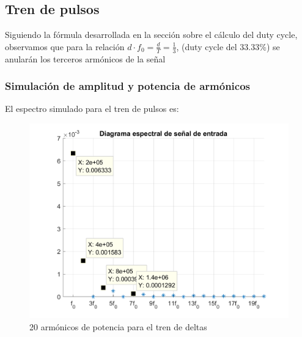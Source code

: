 \documentclass[../../labo_tp5_main.tex]{subfiles}
\begin{document}
\subsection{Tren de pulsos}

Siguiendo la fórmula desarrollada en la sección sobre el cálculo del duty cycle, observamos que para la relación $d \cdot f_0= \frac{d}{T}= \frac{1}{3} $, (duty cycle del 33.33\%) se anularán los terceros armónicos de la señal\par

\subsubsection{Simulación de amplitud y potencia de armónicos}
El espectro simulado para el tren de pulsos es:\par

\begin{figure}[H]	
	\centering
	\includegraphics[scale=0.4]{imagenes/espectro_tren_pulsos.png}
	\caption{20 armónicos de potencia para el tren de deltas}
	\label{fig:ej1_espectro_tren_pulsos}
\end{figure}
\end{document}
